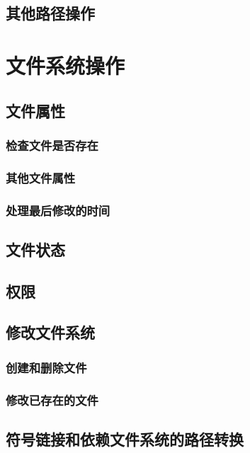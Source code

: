 \subsection{其他路径操作}


\section{文件系统操作}

\subsection{文件属性}

\subsubsection{检查文件是否存在}\label{ch20.4.1.1}

\subsubsection{其他文件属性}

\subsubsection{处理最后修改的时间}

\subsection{文件状态}

\subsection{权限}

\subsection{修改文件系统}

\subsubsection{创建和删除文件}

\subsubsection{修改已存在的文件}

\subsection{符号链接和依赖文件系统的路径转换}\label{ch20.4.5}

